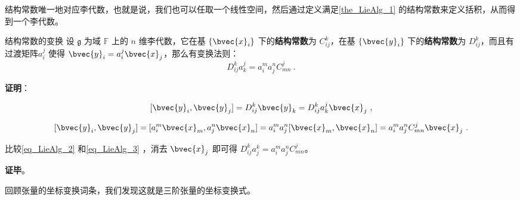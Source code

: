 结构常数唯一地对应李代数，也就是说，我们也可以任取一个线性空间，然后通过定义满足\autoref{the_LieAlg_1} 的结构常数来定义括积，从而得到一个李代数。

\begin{theorem}{结构常数的变换}
设 $\mathfrak{g}$ 为域 $\mathbb{F}$ 上的 $n$ 维李代数，它在基 $\{\bvec{x}_i\}$ 下的\textbf{结构常数}为 $C^k_{ij}$，在基 $\{\bvec{y}_i\}$ 下的\textbf{结构常数}为 $D^k_{ij}$，而且有过渡矩阵$a_i^j$ 使得 $\bvec{y}_i=a_i^j\bvec{x}_j$，那么有变换法则：
\begin{equation}
D_{ij}^k a_k^j=a_i^m a_j^n C^j_{mn}~.
\end{equation}

\end{theorem}

\textbf{证明}：

\begin{equation}\label{eq_LieAlg_2}
[\bvec{y}_i, \bvec{y}_j] = D_{ij}^k \bvec{y}_k = D_{ij}^k a_k^j \bvec{x}_j~,
\end{equation}

\begin{equation}\label{eq_LieAlg_3}
[\bvec{y}_i, \bvec{y}_j]=[a_i^m \bvec{x}_m, a_j^n \bvec{x}_n]=a_i^m a_j^n[\bvec{x}_m, \bvec{x}_n]=a_i^m a_j^n C^j_{mn} \bvec{x}_j~.
\end{equation}

比较\autoref{eq_LieAlg_2} 和\autoref{eq_LieAlg_3} ，消去 $\bvec{x}_j$ 即可得 $D_{ij}^k a^k_j = a_i^m a_j^n C^j_{mn}$。

\textbf{证毕}。

回顾张量的坐标变换词条，我们发现这就是三阶张量的坐标变换式。






